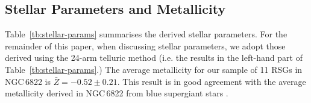 \begin{table}
\begin{center}
\begin{tabular}{lc cccc c cccc}


  \hline
  \end{tabular}
  \end{center}
\end{table}

\subsection{Stellar Parameters and Metallicity} %
\label{sub:stellar_parameters_and_metallicity}

Table~\ref{tb:stellar-params} summarises the derived stellar parameters.
For the remainder of this paper, when discussing stellar parameters,
we adopt those derived using the 24-arm telluric method
(i.e. the results in the left-hand part of Table~\ref{tb:stellar-params}.)
The average metallicity for our sample of 11 RSGs in NGC\,6822 is
$\bar{Z} = -0.52\pm 0.21$.
This result is in good agreement with the average metallicity derived in
NGC\,6822 from blue supergiant stars
\citep[BSGs;][]{1999A&A...352L..40M,2001ApJ...547..765V}.

